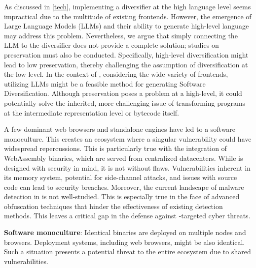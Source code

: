 \begin{strategy}
    As discussed in \autoref{tech}, implementing a diversifier at the high language level seems impractical due to the multitude of existing frontends.
    However, the emergence of Large Language Models (LLMs) and their ability to generate high-level language may address this problem. 
    Nevertheless, we argue that simply connecting the LLM to the diversifier does not provide a complete solution; studies on preservation must also be conducted.
    Specifically, high-level diversification might lead to low preservation, thereby challenging the assumption of diversification at the low-level.
    In the context of \Wasm, considering the wide variety of frontends, utilizing LLMs might be a feasible method for generating Software Diversification.
    Although preservation poses a problem at a high-level, it could potentially solve the inherited, more challenging issue of transforming programs at the intermediate representation level or \Wasm bytecode itself.
 
\end{strategy}



A few dominant web browsers and standalone engines have led to a software monoculture.
This creates an ecosystem where a singular vulnerability could have widespread repercussions.
This is particularly true with the integration of WebAssembly binaries, which are served from centralized datacenters. 
While \Wasm is designed with security in mind, it is not without flaws.
Vulnerabilities inherent in its memory system, potential for side-channel attacks, and issues with source code can lead to security breaches. 
Moreover, the current landscape of malware detection in \Wasm is not well-studied.
This is especially true in the face of advanced obfuscation techniques that hinder the effectiveness of existing detection methods.
This leaves a critical gap in the defense against \Wasm-targeted cyber threats.



\item \label{prob2} \textbf{Software monoculture}: 
Identical \Wasm binaries are deployed on multiple nodes and browsers. 
Deployment systems, including web browsers, might be also identical. 
Such a situation presents a potential threat to the entire ecosystem due to shared vulnerabilities.


